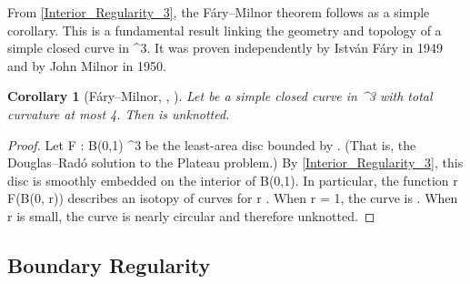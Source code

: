 \documentclass[a4paper, 11pt]{article}
\theoremstyle{plain}
\newtheorem{corollary}[theorem]{Corollary}
\theoremstyle{definition}
\theoremstyle{remark}
\numberwithin{equation}{subsection}
\def\({}
\def\){}
\def\pi{}
\begin{document}
\begin{comment}
\begin{proof}
Since \(\Gamma\) has finite total curvature, \cref{Basic_Property_1} implies that it is also rectifiable, so we may apply Theorems \ref{Interior_regularity_basic_estimate} and \ref{Interior_Regularity_2}. If \(M\) is contained in a cone, then both its mean and scalar curvatures vanish, and so \(M\) is locally planar. If \(M\) is not contained in any cone, then we have a strict inequality in \cref{Interior_regularity_basic_estimate}, and so we have the following estimate:
\begin{equation}
\Theta^{2}(M,p) < \Theta^{2}(\operatorname{Cone}(\Gamma,p),p) \leqslant \frac{1}{2\pi}\operatorname{TotalCurvature}(\Gamma) \leqslant \frac{4\pi}{2\pi} = 2.
\end{equation}
But we know that the density of \(M\) at any interior branch point or self-intersection point is at least \(2\), so \(p\) cannot be such a point. Hence the interior of \(M\) must be smoothly embedded.
\end{proof}
\end{comment}

From \cref{Interior_Regularity_3}, the F{\'a}ry--Milnor theorem follows as a simple corollary.  This is a fundamental result linking the geometry and topology of a simple closed curve in \(^{3}\). It was proven independently by Istv{\'a}n F{\'a}ry in 1949 and by John Milnor in 1950.

\begin{corollary}[F{\'a}ry--Milnor, \cite{Far49}, \cite{Mil50}]
Let \(\Gamma\) be a simple closed curve in \(^{3}\) with total curvature at most \(4\pi\). Then \(\Gamma\) is unknotted.
\end{corollary}

\begin{proof}
Let \(F : B(0,1) \rightarrow {}^{3}\) be the least-area disc bounded by \(\Gamma\). (That is, the Douglas--Rad{\'o} solution to the Plateau problem.) By  \cref{Interior_Regularity_3}, this disc is smoothly embedded on the interior of \(B(0,1)\). In particular, the function \(r \mapsto F(\partial B(0, r))\) describes an isotopy of curves for \(r \). When \(r = 1\), the curve is \(\Gamma\). When \(r\) is small, the curve is nearly circular and therefore unknotted.
\end{proof}

\subsection{Boundary Regularity}
\end{document}
